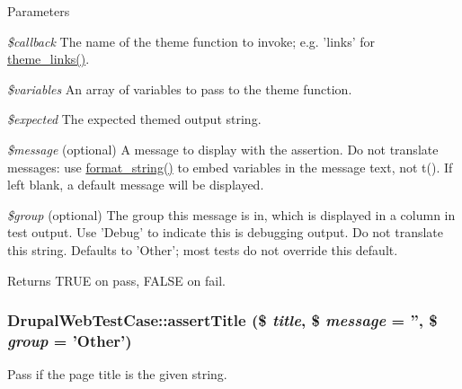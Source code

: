 \begin{DoxyParams}{Parameters}
\item[{\em \$callback}]The name of the theme function to invoke; e.g. 'links' for \hyperlink{group__themeable_gab75b290dbc9541e2fb0d9e57cbcdda5c}{theme\_\-links()}. \item[{\em \$variables}]An array of variables to pass to the theme function. \item[{\em \$expected}]The expected themed output string. \item[{\em \$message}](optional) A message to display with the assertion. Do not translate messages: use \hyperlink{group__sanitization_ga8da272cf93fb6ba229eca7c0b06ea4d2}{format\_\-string()} to embed variables in the message text, not t(). If left blank, a default message will be displayed. \item[{\em \$group}](optional) The group this message is in, which is displayed in a column in test output. Use 'Debug' to indicate this is debugging output. Do not translate this string. Defaults to 'Other'; most tests do not override this default.\end{DoxyParams}
\begin{DoxyReturn}{Returns}
TRUE on pass, FALSE on fail. 
\end{DoxyReturn}
\hypertarget{classDrupalWebTestCase_a4bb17839035399f3c73befdd4bd0da5b}{
\subsubsection[{assertTitle}]{\setlength{\rightskip}{0pt plus 5cm}DrupalWebTestCase::assertTitle (\$ {\em title}, \/  \$ {\em message} = {\ttfamily ''}, \/  \$ {\em group} = {\ttfamily 'Other'})}}
\label{classDrupalWebTestCase_a4bb17839035399f3c73befdd4bd0da5b}
Pass if the page title is the given string.


